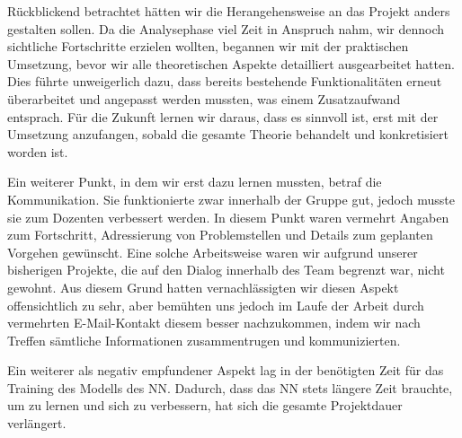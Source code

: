\documentclass[12pt,a4paper]{article}
\begin{document}
Rückblickend betrachtet hätten wir die Herangehensweise an das Projekt anders gestalten sollen. Da die Analysephase viel Zeit in Anspruch nahm, wir dennoch sichtliche Fortschritte erzielen wollten, begannen wir mit der praktischen Umsetzung, bevor wir alle theoretischen Aspekte detailliert ausgearbeitet hatten. Dies führte unweigerlich dazu, dass bereits bestehende Funktionalitäten erneut überarbeitet und angepasst werden mussten, was einem Zusatzaufwand entsprach. Für die Zukunft lernen wir daraus, dass es sinnvoll ist, erst mit der Umsetzung anzufangen, sobald die gesamte Theorie behandelt und konkretisiert worden ist.

Ein weiterer Punkt, in dem wir erst dazu lernen mussten, betraf die Kommunikation. Sie funktionierte zwar innerhalb der Gruppe gut, jedoch musste sie zum Dozenten verbessert werden. In diesem Punkt waren vermehrt Angaben zum Fortschritt, Adressierung von Problemstellen und Details zum geplanten Vorgehen gewünscht. Eine solche Arbeitsweise waren wir aufgrund unserer bisherigen Projekte, die auf den Dialog innerhalb des Team begrenzt war, nicht gewohnt. Aus diesem Grund hatten vernachlässigten wir diesen Aspekt offensichtlich zu sehr, aber bemühten uns jedoch im Laufe der Arbeit durch vermehrten E-Mail-Kontakt diesem besser nachzukommen, indem wir nach Treffen sämtliche Informationen zusammentrugen und kommunizierten.

Ein weiterer als negativ empfundener Aspekt lag in der benötigten Zeit für das Training des Modells des NN. Dadurch, dass das NN stets längere Zeit brauchte, um zu lernen und sich zu verbessern, hat sich die gesamte Projektdauer verlängert.



\pagebreak

\end{document}
